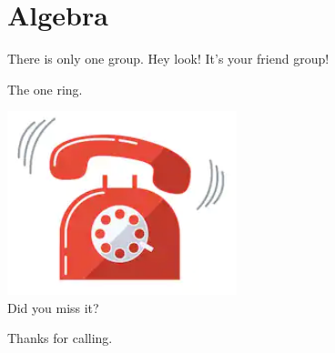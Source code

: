 \setcounter{section}{0}

\section{Algebra}
There is only one group. Hey look! It's your friend group!
\begin{center}
\end{center}

The one ring.
\begin{center}
  \includegraphics[width=0.5\textwidth]{ring.png}\\
  Did you miss it?
\end{center}
Thanks for calling.
